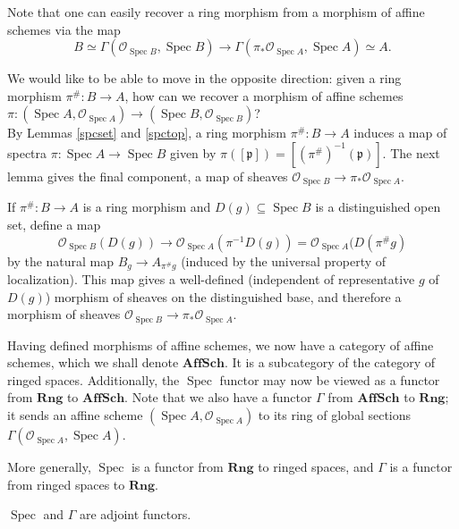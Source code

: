 \documentclass[11pt,openany]{book} %
\newcommand{\spc}{\operatorname{Spec}}
\begin{document}
Note that one can easily recover a ring morphism from a morphism of affine schemes via the map
\[
B \simeq \Gamma(\mathcal{O}_{\spc B},\spc B) \longrightarrow \Gamma(\pi_*\mathcal{O}_{\spc A},\spc A) \simeq A.
\]

We would like to be able to move in the opposite direction: given a ring morphism $\pi^{\#} : B \to A$, how can we recover a morphism of affine schemes $\pi : (\spc A, \mathcal{O}_{\spc A}) \longrightarrow (\spc B, \mathcal{O}_{\spc B})$?\\

By Lemmas \ref{spcset} and \ref{spctop},  a ring morphism $\pi^{\#} : B \to A$ induces a map of spectra $\pi : \spc A \to \spc B$ given by $\pi([\mathfrak{p}]) = [(\pi^{\#})^{-1}(\mathfrak{p})]$. The next lemma gives the final component, a map of sheaves $\mathcal{O}_{\spc B} \longrightarrow \pi_*\mathcal{O}_{\spc A}$.\\ 

\begin{lemma} \label{spcsheaf}
If $\pi^{\#} : B \to A$ is a ring morphism and $D(g) \subseteq \spc B$ is a distinguished open set, define a map
\[
\mathcal{O}_{\spc B}(D(g)) \longrightarrow \mathcal{O}_{\spc A}(\pi^{-1}D(g)) = \mathcal{O}_{\spc A}(D(\pi^{\#}g)
\]
by the natural map $B_g \to A_{\pi^{\#}g}$ (induced by the universal property of localization). This map gives a well-defined (independent of representative $g$ of $D(g)$) morphism of sheaves on the distinguished base, and therefore a morphism of sheaves $\mathcal{O}_{\spc B} \to \pi_*\mathcal{O}_{\spc A}$.
\end{lemma}
\medskip

Having defined morphisms of affine schemes, we now have a category of affine schemes, which we shall denote $\mathbf{AffSch}$. It is a subcategory of the category of ringed spaces. Additionally, the $\spc$ functor may now be viewed as a functor from $\mathbf{Rng}$ to $\mathbf{AffSch}$. Note that we also have a functor $\Gamma$ from $\mathbf{AffSch}$ to $\mathbf{Rng}$; it sends an affine scheme $(\spc A,\mathcal{O}_{\spc A})$ to its ring of global sections $\Gamma(\mathcal{O}_{\spc A}, \spc A)$. 

\begin{remark}
More generally, $\spc$ is a functor from $\mathbf{Rng}$ to ringed spaces, and $\Gamma$ is a functor from ringed spaces to $\mathbf{Rng}$.
\end{remark}

\begin{lemma}
$\spc$ and $\Gamma$ are adjoint functors.
\end{lemma}
\medskip
\end{document}
